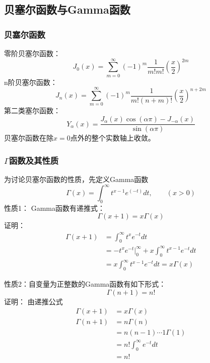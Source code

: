 \subsection{贝塞尔函数与Gamma函数}

\begin{frame}
	\frametitle{贝塞尔函数}
	零阶贝塞尔函数：
	\begin{equation*}
		J_0(x) = \sum\limits_{m=0}^{\infty} (-1)^m  \frac{1}{m! m! } (\frac{x}{2})^{2m} 
	\end{equation*}	
	n阶贝塞尔函数：
	\begin{equation*}
		J_n(x) = \sum\limits_{m=0}^{\infty} (-1)^m  \frac{1}{m! (n+m) ! } (\frac{x}{2})^{n+2m} 
	\end{equation*}	
	第二类塞尔函数：
	\begin{equation*}
		Y_{\alpha}(x)=\frac{J_{\alpha}(x) \cos (\alpha \pi)-J_{-\alpha}(x)}{\sin (\alpha \pi)}
	\end{equation*}	
	贝塞尔函数在除$x=0$点外的整个实数轴上收敛。
\end{frame}	

\begin{frame}
	\frametitle{$\Gamma$函数及其性质}
	为讨论贝塞尔函数的性质，先定义Gamma函数
	\begin{equation*}
		\Gamma(x)=\int_{0}^{\infty} t^{x-1} e^(-t) dt, \qquad (x>0)
	\end{equation*}	
	\alert{性质1：} Gamma函数有递推式：
	\begin{equation*}
		\Gamma(x+1)=x \Gamma(x)
	\end{equation*}	
	\alert{证明：}  
	\begin{equation*}
	\begin{split}
		\Gamma(x+1)&= \int_{0}^{\infty} t^{x} e^{-t} dt \\
		&= -t^x e^{-t} |_0 ^\infty + x \int_{0}^{\infty} t^{x-1} e^{-t} dt \\
		&= x \int_{0}^{\infty} t^{x-1} e^{-t} dt =x \Gamma(x)
	\end{split}
	\end{equation*}	
\end{frame}	

\begin{frame}
	\alert{性质2：}自变量为正整数的Gamma函数有如下形式：
	\begin{equation*}
		\Gamma(n+1)=n!
	\end{equation*}	
	\alert{证明：}  由递推公式
	\begin{equation*}
	\begin{split}
		\Gamma(x+1)&=x \Gamma(x) \\
		\Gamma(n+1)&=n \Gamma(n) \\
		&=n(n-1)\cdots 1 \Gamma(1) \\
		&=n! \int_{0}^{\infty}  e^{-t} dt \\
		&=n!
	\end{split}
	\end{equation*}	
\end{frame}	

